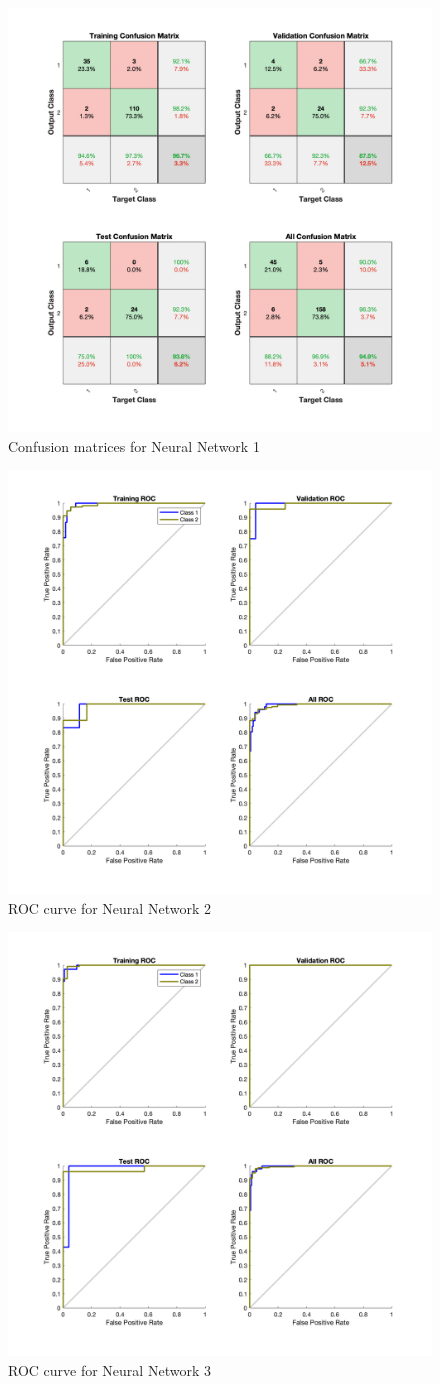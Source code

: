 \documentclass[9pt,technote]{IEEEtran}
\begin{document}
\begin{figure}
	\centering
	\includegraphics[width=0.7\linewidth]{Resources/confusion_matrix_1_layers_10}
	\caption{Confusion matrices for Neural Network 1}
	\label{fig:confusionmatrix1layers10}
\end{figure}
\begin{figure}
	\centering
	\includegraphics[width=0.7\linewidth]{Resources/receiver_operating_characteristic_1_layers_20}
	\caption{ROC curve for Neural Network 2}
	\label{fig:receiveroperatingcharacteristic1layers20}
\end{figure}
\begin{figure}
	\centering
	\includegraphics[width=0.7\linewidth]{Resources/receiver_operting_characteristic_4_layers_20-10-5}
	\caption{ROC curve for Neural Network 3}
	\label{fig:receiveropertingcharacteristic4layers20-10-5}
\end{figure}



\end{document}
